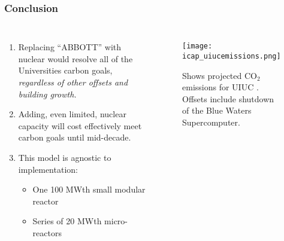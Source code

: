 \begin{frame}
  \frametitle{Conclusion}
  \begin{columns}
    \column[t]{5cm}
    \begin{enumerate}
      \item Replacing ``ABBOTT'' with nuclear would resolve all of the Universities
      carbon goals, \textit{regardless of other offsets and building growth.}
      \item Adding, even limited, nuclear capacity will cost effectively meet carbon goals until mid-decade.
      \item This model is agnostic to implementation:
      \begin{itemize}
        \item One 100 MWth small modular reactor
        \item Series of 20 MWth micro-reactors
      \end{itemize}
    \end{enumerate}
    \column[t]{5cm}
    \begin{figure}
      \centering
      \texttt{[image: icap\_uiucemissions.png]}
      \caption{Shows projected CO$_2$ emissions for UIUC \cite{isee_illinois_2015}. Offsets include shutdown of the Blue Waters Supercomputer.}
      \label{fig:co2projections}
    \end{figure}
  \end{columns}
\end{frame}
